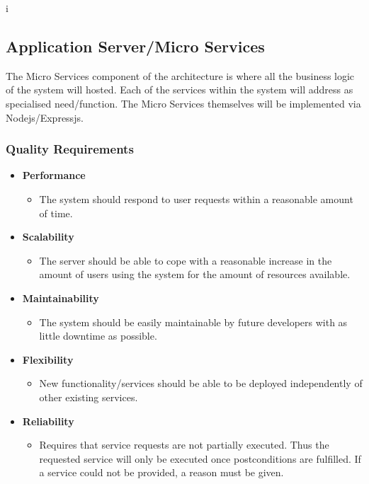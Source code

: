 i\documentclass[a4paper,12pt]{article}
\begin{document}
	\newpage
	\subsection{Application Server/Micro Services}
	The Micro Services component of the architecture is where all the business logic of the system will hosted. Each of the services within the system will address as specialised need/function. The Micro Services themselves will be implemented via Nodejs/Expressjs.
	
	\subsubsection{Quality Requirements}
	\begin{itemize}
		\item\textbf{Performance}
		\begin{itemize}
			\item The system should respond to user requests within a reasonable amount of time.
		\end{itemize}
		
		\item\textbf{Scalability}
		\begin{itemize}
			\item The server should be able to cope with a reasonable increase in the amount of users using the system for the amount of resources available. 
		\end{itemize}
		
		\item\textbf{Maintainability}
		\begin{itemize}
			\item The system should be easily maintainable by future developers with as little downtime as possible. 
		\end{itemize}
		
		\item\textbf{Flexibility}
		\begin{itemize}
			\item New functionality/services should be able to be deployed independently of other existing services.
		\end{itemize}
		
		\item\textbf{Reliability}
		\begin{itemize}
			\item Requires that service requests are not partially executed. Thus the requested service will only be executed once postconditions are fulfilled. If a service could not be provided, a reason must be given.
		\end{itemize}
		

\end{itemize}
\end{document}
